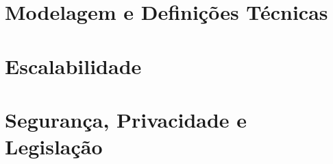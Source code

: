 \section{Modelagem e Definições Técnicas}



\section{Escalabilidade}

\section{Segurança, Privacidade e Legislação}

